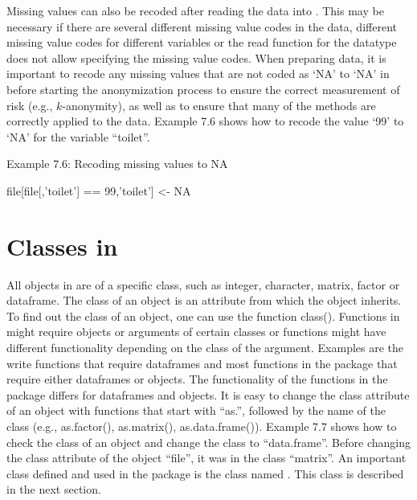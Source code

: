 \documentclass[letterpaper,10pt,english]{sphinxmanual}
\begin{document}
Missing values can also be recoded after reading the data into . This
may be necessary if there are several different missing value codes in
the data, different missing value codes for different variables or the
read function for the datatype does not allow specifying the missing
value codes. When preparing data, it is important to recode any missing
values that are not coded as ‘NA’ to ‘NA’ in  before starting the
anonymization process to ensure the correct measurement of risk (e.g.,
\(k\)-anonymity), as well as to ensure that many of the methods are
correctly applied to the data. Example 7.6 shows how to recode the value
‘99’ to ‘NA’ for the variable “toilet”.

Example 7.6: Recoding missing values to NA

file{[}file{[},’toilet’{]} == 99,’toilet’{]} \textless{}- NA 


\section{Classes in }
\label{\detokenize{sdcMicro:classes-in-r}}
All objects in  are of a specific class, such as integer, character,
matrix, factor or dataframe. The class of an object is an attribute from
which the object inherits. To find out the class of an object, one can
use the function class(). Functions in  might require objects or
arguments of certain classes or functions might have different
functionality depending on the class of the argument. Examples are the
write functions that require dataframes and most functions in the
 package that require either dataframes or  objects.
The functionality of the functions in the  package differs for
dataframes and  objects. It is easy to change the class
attribute of an object with functions that start with “as.”, followed by
the name of the class (e.g., as.factor(), as.matrix(), as.data.frame()).
Example 7.7 shows how to check the class of an object and change the
class to “data.frame”. Before changing the class attribute of the object
“file”, it was in the class “matrix”. An important class defined and
used in the  package is the class named . This
class is described in the next section.
\end{document}
